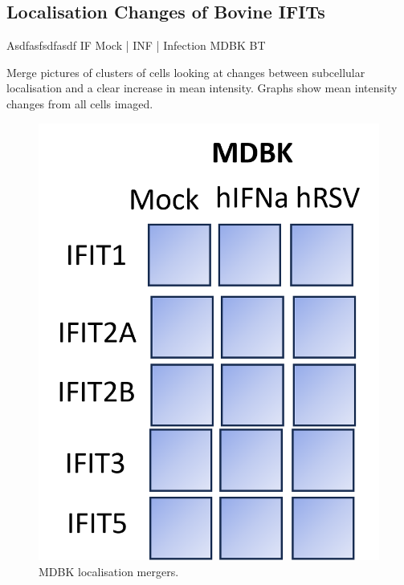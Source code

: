 \subsection{Localisation Changes of Bovine IFITs} \label{Localisation Changes of Bovine IFITs}
Asdfasfsdfasdf \newline
IF Mock | INF | Infection \newline
MDBK BT

Merge pictures of clusters of cells looking at changes between subcellular localisation and a clear increase in mean intensity. Graphs show mean intensity changes from all cells imaged.

\begin{figure}
    \centering
    \includegraphics[width=1\linewidth]{07. Chapter 2/Figs/03. Localisation/01. mdbk merges.png}
    \caption[MDBK localisation mergers.]{MDBK localisation mergers.}
    \label{MDBK localisation mergers.}
\end{figure}


